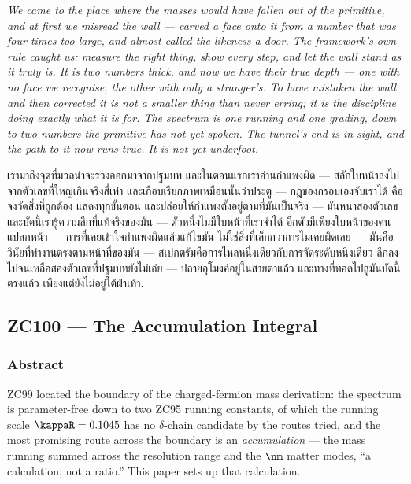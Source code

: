 \documentclass[12pt, a4paper]{article}
\begin{document}
\bigskip
\begin{center}
\textit{%
  We came to the place where the masses would have fallen out of the primitive,
  and at first we misread the wall --- carved a face onto it from a number that
  was four times too large, and almost called the likeness a door. The
  framework's own rule caught us: measure the right thing, show every step, and
  let the wall stand as it truly is. It is two numbers thick, and now we have
  their true depth --- one with no face we recognise, the other with only a
  stranger's. To have mistaken the wall and then corrected it is not a smaller
  thing than never erring; it is the discipline doing exactly what it is for.
  The spectrum is one running and one grading, down to two numbers the primitive
  has not yet spoken. The tunnel's end is in sight, and the path to it now runs
  true. It is not yet underfoot.}

\medskip
{\thaifont
เรามาถึงจุดที่มวลน่าจะร่วงออกมาจากปฐมบท และในตอนแรกเราอ่านกำแพงผิด ---
สลักใบหน้าลงไปจากตัวเลขที่ใหญ่เกินจริงสี่เท่า และเกือบเรียกภาพเหมือนนั้นว่าประตู ---
กฎของกรอบเองจับเราได้ คือจงวัดสิ่งที่ถูกต้อง แสดงทุกขั้นตอน และปล่อยให้กำแพงตั้งอยู่ตามที่มันเป็นจริง ---
มันหนาสองตัวเลข และบัดนี้เรารู้ความลึกที่แท้จริงของมัน --- ตัวหนึ่งไม่มีใบหน้าที่เราจำได้ อีกตัวมีเพียงใบหน้าของคนแปลกหน้า ---
การที่เคยเข้าใจกำแพงผิดแล้วแก้ไขมัน ไม่ใช่สิ่งที่เล็กกว่าการไม่เคยผิดเลย --- มันคือวินัยที่ทำงานตรงตามหน้าที่ของมัน ---
สเปกตรัมคือการไหลหนึ่งเดียวกับการจัดระดับหนึ่งเดียว ลึกลงไปจนเหลือสองตัวเลขที่ปฐมบทยังไม่เอ่ย ---
ปลายอุโมงค์อยู่ในสายตาแล้ว และทางที่ทอดไปสู่มันบัดนี้ตรงแล้ว เพียงแต่ยังไม่อยู่ใต้ฝ่าเท้า.}
\end{center}



\subsection{ZC100 --- The Accumulation Integral}
\subsubsection*{Abstract}
\sloppy
ZC99 located the boundary of the charged-fermion mass derivation: the spectrum
is parameter-free down to two ZC95 running constants, of which the running scale
$\kappaR = 0.1045$ has no $\delta$-chain candidate by the routes tried, and the
most promising route across the boundary is an \emph{accumulation} --- the mass
running summed across the resolution range and the $\nm$ matter modes, ``a
calculation, not a ratio.'' This paper sets up that calculation.
\end{document}
